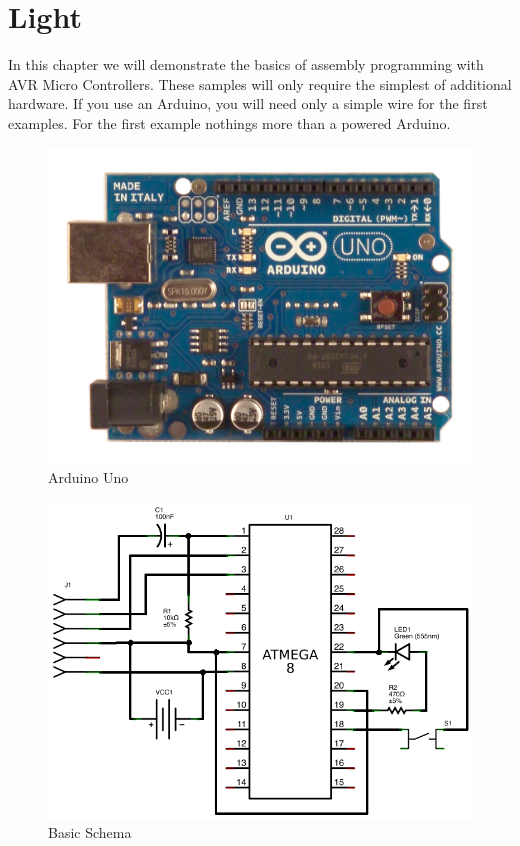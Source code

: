 \documentclass[twoside,english,12pt,authoryear,openright]{book}
\begin{document}
\chapter{Light}

In this chapter we will demonstrate the basics of assembly programming with AVR Micro Controllers. These samples will only require the simplest of additional hardware. If you use an Arduino, you will need only a simple wire for the first examples. For the first example nothings more than a powered Arduino.

\begin{figure}[htbp]
  \centering
  \includegraphics[width=120mm]{Media/www-arduino-cc_ArduinoUnoFront.jpeg}
  \caption{Arduino Uno}
  \label{ArduinoUnoFront}
\end{figure}



\begin{figure}[htbp]
  \centering
  \includegraphics[width=120mm]{LED/S000_LED-Basic-Circuit_schema.png}
  \caption{Basic Schema}
  \label{atmega8-basic-schema}
\end{figure}
\end{document}
